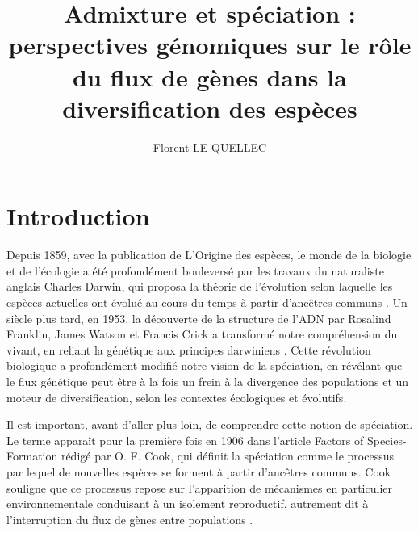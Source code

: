 \documentclass[12pt,a4paper]{article}
\title{\textbf{Admixture et spéciation : perspectives génomiques sur le rôle du flux de gènes dans la diversification des espèces}}
\author{Florent LE QUELLEC}
\date{}
\begin{document}
\maketitle

\begin{abstract}

\end{abstract}

\tableofcontents
\newpage

\section{Introduction}

Depuis 1859, avec la publication de L’Origine des espèces, le monde de la biologie et de l’écologie a été profondément bouleversé par les travaux du naturaliste anglais Charles Darwin, qui proposa la théorie de l’évolution selon laquelle les espèces actuelles ont évolué au cours du temps à partir d’ancêtres communs \parencite{darwin1859origin}.
Un siècle plus tard, en 1953, la découverte de la structure de l’ADN par Rosalind Franklin, James Watson et Francis Crick a transformé notre compréhension du vivant, en reliant la génétique aux principes darwiniens \parencite{watson1953molecular}.
Cette révolution biologique a profondément modifié notre vision de la spéciation, en révélant que le flux génétique peut être à la fois un frein à la divergence des populations et un moteur de diversification, selon les contextes écologiques et évolutifs.

Il est important, avant d’aller plus loin, de comprendre cette notion de spéciation. Le terme apparaît pour la première fois en 1906 dans l’article Factors of Species-Formation rédigé par O. F. Cook, qui définit la spéciation comme le processus par lequel de nouvelles espèces se forment à partir d’ancêtres communs. Cook souligne que ce processus repose sur l’apparition de mécanismes en particulier environnementale conduisant à un isolement reproductif, autrement dit à l’interruption du flux de gènes entre populations \parencite{cook1906factors}.
\end{document}
